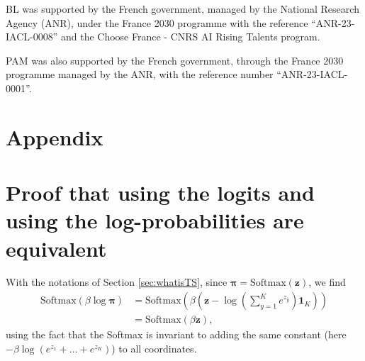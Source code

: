 \documentclass[10pt,dvipsnames]{article}
\newcommand{\bz}{\mathbf{z}}%
\newcommand{\bpi}{\boldsymbol{\pi}}%
\newcommand{\bun}{\mathbf{1}}%
\theoremstyle{plain}
\theoremstyle{definition}
\theoremstyle{remark}
\begin{document}
BL was supported by the French government, managed by the National Research Agency (ANR), under the France 2030 programme with the reference ``ANR-23-IACL-0008'' and the Choose France - CNRS AI Rising Talents program. 

PAM was also supported by the French government, through the France 2030 programme managed by the ANR, with the reference number ``ANR-23-IACL-0001''.





\newpage
\appendix
\section*{\LARGE Appendix}
\section{Proof that using the logits and using the log-probabilities are equivalent}
\label{app:logitsvsloprobs}
With the notations of Section \ref{sec:whatisTS}, since  $\boldsymbol{\pi} = \text{Softmax} (\bz )$, we find
\begin{align}
    \text{Softmax} (\beta \log \bpi ) &= \text{Softmax} \left(\beta \left(\bz - \log\left(\sum_{y=1}^Ke^{z_y}\right)  \bun_K \right)  \right) \\
    &=  \text{Softmax} (\beta \bz ),
\end{align}
using the fact that the Softmax is invariant to adding the same constant (here $-\beta \log (e^{z_1}+ \ldots + e^{z_K})$) to all coordinates.
\end{document}
